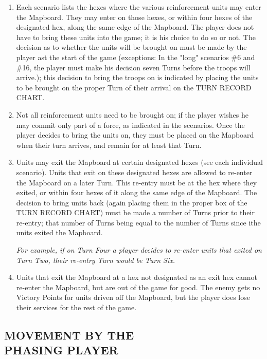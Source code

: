 \begin{enumerate}
  \item Each scenario lists the hexes where the various reinforcement units may enter the Mapboard. They may enter on those hexes, or within four hexes of the designated hex, along the same edge of the Mapboard. The player does not have to bring these units into the game; it is his choice to do so or not. The decision as to whether the units will be brought on must be made by the player ast the start of the game (exceptions: In the "long" scenarios \#6 and \#16, the player must make his decision seven Turns before the troops will arrive.); this decision to bring the troops on is indicated by placing the units to be brought on the proper Turn of their arrival on the TURN RECORD CHART.

  \item Not all reinforcement units need to be brought on; if the player wishes he may commit only part of a force, as indicated in the scenarios. Once the player decides to bring the units on, they must be placed on the Mapboard when their turn arrives, and remain for at least that Turn.

  \item Units may exit the Mapboard at certain designated hexes (see each individual scenario). Units that exit on these designated hexes are allowed to re-enter the Mapboard on a later Turn. This re-entry must be at the hex where they exited, or within four hexes of it along the same edge of the Mapboard. The decision to bring units back (again placing them in the proper box of the TURN RECORD CHART) must be made a number of Turns prior to their re-entry; that number of Turns being equal to the number of Turns since ithe units exited the Mapboard.

  \textit{For example, if on Turn Four a player decides to re-enter units that exited on Turn Two, their re-entry Turn would be Turn Six.}

  \item Units that exit the Mapboard at a hex not designated as an exit hex cannot re-enter the Mapboard, but are out of the game for good. The enemy gets no Victory Points for units driven off the Mapboard, but the player does lose their services for the rest of the game.
\end{enumerate}

\subsection{MOVEMENT BY THE\\PHASING PLAYER}

